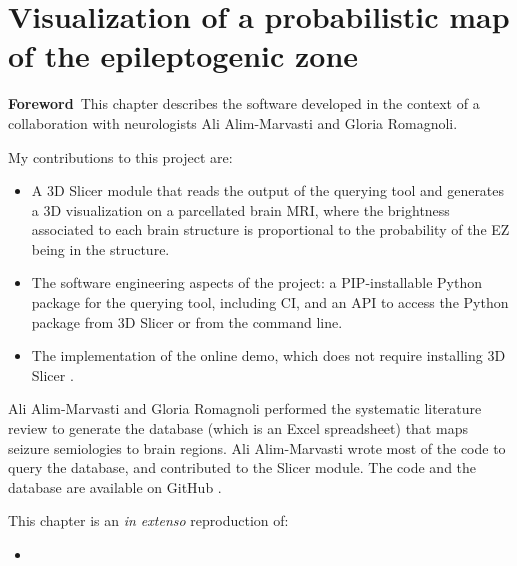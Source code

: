 \chapter[Visualization of a probabilistic map of the epileptogenic zone]{Visualization of a probabilistic map of the epileptogenic zone}

\label{chap:svt}

\minitoc

\acresetall
\begin{center}
  \begin{minipage}[b]{0.9\linewidth}
    \small
    \textbf{Foreword\,}
    This chapter describes the software developed in the context of a collaboration with neurologists Ali Alim-Marvasti and Gloria Romagnoli.

    My contributions to this project are:
    \begin{itemize}
      \item A 3D Slicer module \cite{fedorov_3d_2012} that reads the output of the querying tool and generates a 3D visualization on a parcellated brain \ac{MRI}, where the brightness associated to each brain structure is proportional to the probability of the \ac{EZ} being in the structure.
      \item The software engineering aspects of the project: a \acs{PIP}-installable Python package for the querying tool, including \ac{CI}, and an \ac{API} to access the Python package from 3D Slicer or from the command line.
      \item The implementation of the online demo, which does not require installing 3D Slicer%
      .
    \end{itemize}
  \end{minipage}

  \begin{minipage}[b]{0.9\linewidth}
    \small
    Ali Alim-Marvasti and Gloria Romagnoli performed the systematic literature review to generate the database (which is an Excel spreadsheet) that maps seizure semiologies to brain regions.
    Ali Alim-Marvasti wrote most of the code to query the database, and contributed to the Slicer module.
    The code and the database are available on GitHub%
    \fnurl{\svtgithub}.

    This chapter is an \textit{in extenso} reproduction of:
    \begin{itemize}
      \item {}
    \end{itemize}


\end{minipage}
\end{center}
